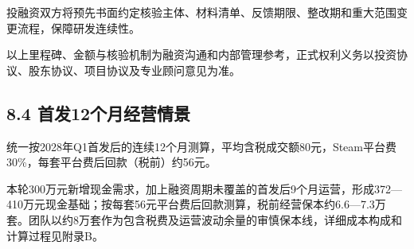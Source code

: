 \documentclass[UTF8,fontset=none,zihao=5,twoside]{ctexart}
\begin{document}
投融资双方将预先书面约定核验主体、材料清单、反馈期限、整改期和重大范围变更流程，保障研发连续性。

\begin{BusinessCallout}

以上里程碑、金额与核验机制为融资沟通和内部管理参考，正式权利义务以投资协议、股东协议、项目协议及专业顾问意见为准。

\end{BusinessCallout}

\subsection{8.4 首发12个月经营情景}\label{84-ux9996ux53d112ux4e2aux6708ux7ecfux8425ux60c5ux666f}

统一按2028年Q1首发后的连续12个月测算，平均含税成交额80元，Steam平台费30\%，每套平台费后回款（税前）约56元。

本轮300万元新增现金需求，加上融资周期未覆盖的首发后9个月运营，形成372---410万元现金基础；按每套56元平台费后回款测算，税前经营保本约6.6---7.3万套。团队以约8万套作为包含税费及运营波动余量的审慎保本线，详细成本构成和计算过程见附录B。
\end{document}
